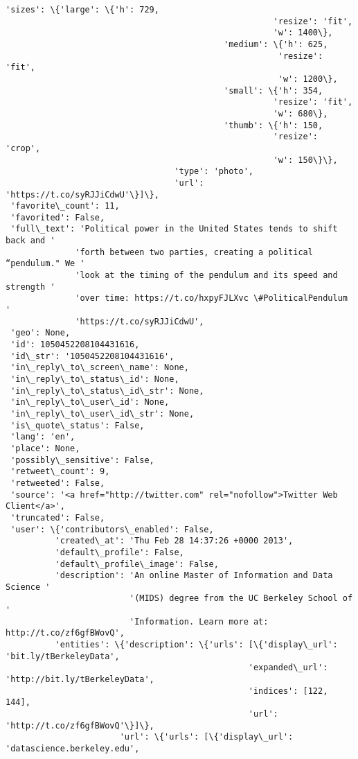 \documentclass[11pt]{article}
\begin{document}
\begin{Verbatim}[commandchars=\\\{\}]
                                  'sizes': \{'large': \{'h': 729,
                                                      'resize': 'fit',
                                                      'w': 1400\},
                                            'medium': \{'h': 625,
                                                       'resize': 'fit',
                                                       'w': 1200\},
                                            'small': \{'h': 354,
                                                      'resize': 'fit',
                                                      'w': 680\},
                                            'thumb': \{'h': 150,
                                                      'resize': 'crop',
                                                      'w': 150\}\},
                                  'type': 'photo',
                                  'url': 'https://t.co/syRJJiCdwU'\}]\},
 'favorite\_count': 11,
 'favorited': False,
 'full\_text': 'Political power in the United States tends to shift back and '
              'forth between two parties, creating a political “pendulum." We '
              'look at the timing of the pendulum and its speed and strength '
              'over time: https://t.co/hxpyFJLXvc \#PoliticalPendulum '
              'https://t.co/syRJJiCdwU',
 'geo': None,
 'id': 1050452208104431616,
 'id\_str': '1050452208104431616',
 'in\_reply\_to\_screen\_name': None,
 'in\_reply\_to\_status\_id': None,
 'in\_reply\_to\_status\_id\_str': None,
 'in\_reply\_to\_user\_id': None,
 'in\_reply\_to\_user\_id\_str': None,
 'is\_quote\_status': False,
 'lang': 'en',
 'place': None,
 'possibly\_sensitive': False,
 'retweet\_count': 9,
 'retweeted': False,
 'source': '<a href="http://twitter.com" rel="nofollow">Twitter Web Client</a>',
 'truncated': False,
 'user': \{'contributors\_enabled': False,
          'created\_at': 'Thu Feb 28 14:37:26 +0000 2013',
          'default\_profile': False,
          'default\_profile\_image': False,
          'description': 'An online Master of Information and Data Science '
                         '(MIDS) degree from the UC Berkeley School of '
                         'Information. Learn more at: http://t.co/zf6gfBWovQ',
          'entities': \{'description': \{'urls': [\{'display\_url': 'bit.ly/tBerkeleyData',
                                                 'expanded\_url': 'http://bit.ly/tBerkeleyData',
                                                 'indices': [122, 144],
                                                 'url': 'http://t.co/zf6gfBWovQ'\}]\},
                       'url': \{'urls': [\{'display\_url': 'datascience.berkeley.edu',

\end{Verbatim}
\end{document}
